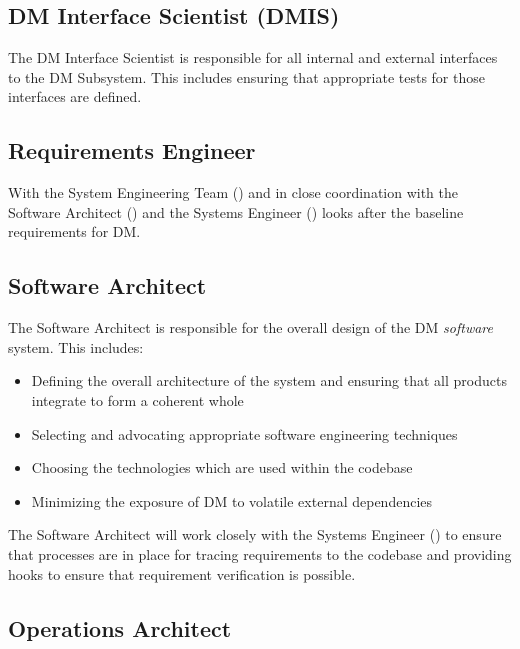 \subsection{DM Interface Scientist (DMIS) \label{role:dmis}}

The DM Interface Scientist is responsible for all internal and external interfaces to the DM Subsystem. This includes ensuring that appropriate tests for those interfaces are defined.

\subsection{Requirements Engineer \label{role:reqeng}}

With the System Engineering Team () and in close coordination with the Software Architect () and the Systems Engineer () looks after the baseline requirements for DM.

\subsection{Software Architect \label{role:softarc}}

The Software Architect is responsible for the overall design of the DM \textit{software} system. This includes:

\begin{itemize}

\item{Defining the overall architecture of the system and ensuring that all products integrate to form a coherent whole}
\item{Selecting and advocating appropriate software engineering techniques}
\item{Choosing the technologies which are used within the codebase}
\item{Minimizing the exposure of DM to volatile external dependencies}

\end{itemize}

The Software Architect will work closely with the Systems Engineer () to ensure that processes are in place for tracing requirements to the codebase and providing hooks to ensure that requirement verification is possible.

\subsection{Operations Architect \label{role:opsarc}}

